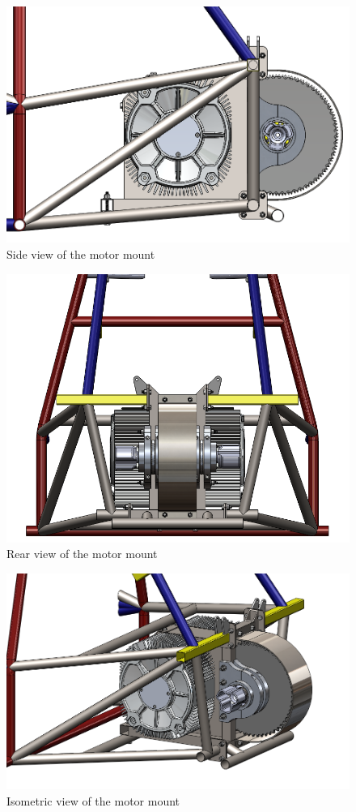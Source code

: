 \documentclass{article}
\begin{document}
            \begin{figure}[H]
                \centering
                \includegraphics[width = 0.6 \textwidth]{motormount_sideview}
                \caption{Side view of the motor mount}
                \label{motormountside}
            \end{figure}
            
            \begin{figure}[H]
                \centering
                \includegraphics[width = 0.6 \textwidth]{motormount_rearview}
                \caption{Rear view of the motor mount}
                \label{motormountrear}
            \end{figure}
            
            \begin{figure}[H]
                \centering
                \includegraphics[width = 0.6 \textwidth]{motormount_isoview}
                \caption{Isometric view of the motor mount}
                \label{motormountiso}
            \end{figure}
\end{document}
